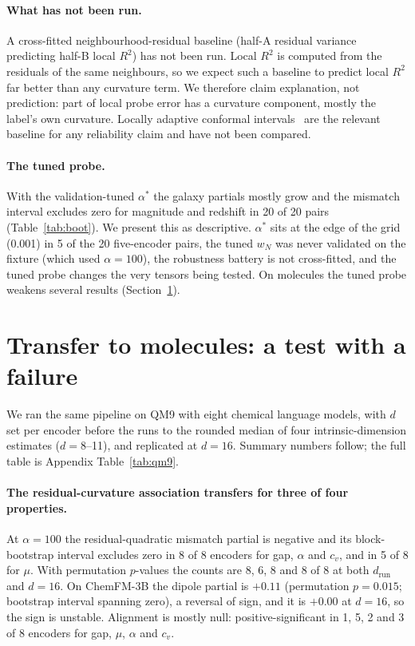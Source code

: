 \documentclass[10pt]{article}
\begin{document}
\paragraph{What has not been run.} A cross-fitted neighbourhood-residual baseline (half-A residual variance predicting half-B local $R^2$) has not been run. Local $R^2$ is computed from the residuals of the same neighbours, so we expect such a baseline to predict local $R^2$ far better than any curvature term. We therefore claim explanation, not prediction: part of local probe error has a curvature component, mostly the label's own curvature. Locally adaptive conformal intervals~\citep{tamenarvaez2026beyond} are the relevant baseline for any reliability claim and have not been compared.

\paragraph{The tuned probe.} With the validation-tuned $\alpha^*$ the galaxy partials mostly grow and the mismatch interval excludes zero for magnitude and redshift in 20 of 20 pairs (Table~\ref{tab:boot}). We present this as descriptive. $\alpha^*$ sits at the edge of the grid (0.001) in 5 of the 20 five-encoder pairs, the tuned $w_N$ was never validated on the fixture (which used $\alpha=100$), the robustness battery is not cross-fitted, and the tuned probe changes the very tensors being tested. %
On molecules the tuned probe weakens several results (Section~\ref{sec:qm9}).

\section{Transfer to molecules: a test with a failure}
\label{sec:qm9}

We ran the same pipeline on QM9 with eight chemical language models, with $d$ set per encoder before the runs to the rounded median of four intrinsic-dimension estimates ($d=8$--11), and replicated at $d=16$. %
Summary numbers follow; the full table is Appendix Table~\ref{tab:qm9}. %

\paragraph{The residual-curvature association transfers for three of four properties.} At $\alpha=100$ the residual-quadratic mismatch partial is negative and its block-bootstrap interval excludes zero in 8 of 8 encoders for gap, $\alpha$ and $c_v$, and in 5 of 8 for $\mu$. With permutation $p$-values the counts are 8, 6, 8 and 8 of 8 at both $d_{\mathrm{run}}$ and $d=16$. On ChemFM-3B the dipole partial is $+0.11$ (permutation $p=0.015$; bootstrap interval spanning zero), a reversal of sign, and it is $+0.00$ at $d=16$, so the sign is unstable. Alignment is mostly null: positive-significant in 1, 5, 2 and 3 of 8 encoders for gap, $\mu$, $\alpha$ and $c_v$.
\end{document}
